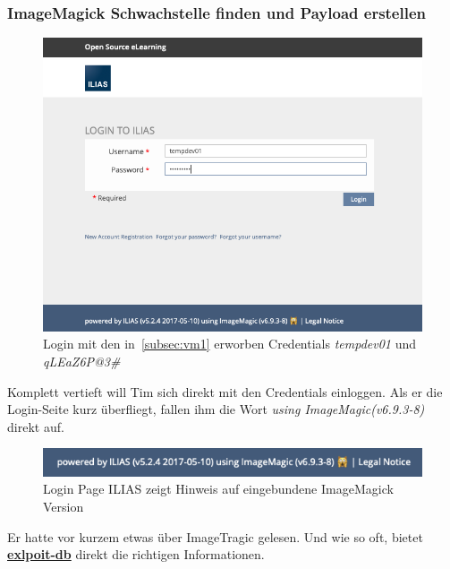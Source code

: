 \documentclass[10pt, a4paper,onecolumn ,titlepage]{article}
\begin{document}
    \subsubsection{ImageMagick Schwachstelle finden und Payload erstellen}
    \label{subsubsec:imageMagickFinden}

    \begin{figure}[H]
        \centering
        \includegraphics[width=1\textwidth]{storyline_bilder_vm2/loginAlsDev01}
        \caption{Login mit den in~\ref{subsec:vm1} erworben Credentials \textit{tempdev01} und \textit{qLEaZ6P@3\#}}
        \label{fig:loginAlsDev}
    \end{figure}
    
    Komplett vertieft will Tim sich direkt mit den Credentials einloggen.
    Als er die Login-Seite kurz überfliegt, fallen ihm die Wort \textit{using ImageMagic(v6.9.3-8)} direkt auf.
    \begin{figure}[H]
        \centering
        \includegraphics[width=1\textwidth]{storyline_bilder_vm2/loginPageHinweisImageMagick}
        \caption{Login Page ILIAS zeigt Hinweis auf eingebundene ImageMagick Version}
        \label{fig:loginPageHinweis}
    \end{figure}

    \noindent
    Er hatte vor kurzem etwas über ImageTragic gelesen.
    Und wie so oft, bietet \href{https://www.exploit-db.com/exploits/39767}{\textbf{exlpoit-db}} direkt die richtigen Informationen.
\end{document}
